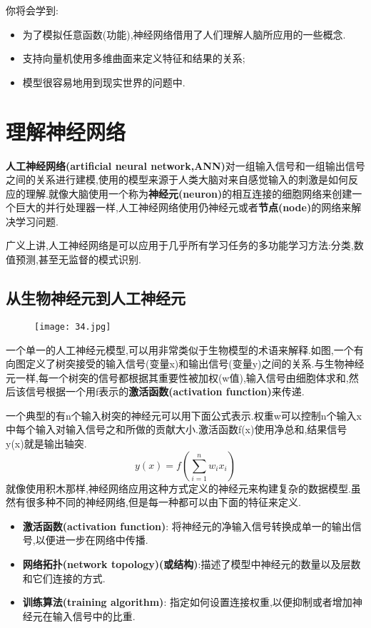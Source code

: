 \documentclass[11pt,a4paper,oneside]{book}
\begin{document}
你将会学到:
\begin{itemize}
	\item 为了模拟任意函数(功能),神经网络借用了人们理解人脑所应用的一些概念.
	\item 支持向量机使用多维曲面来定义特征和结果的关系;
	\item 模型很容易地用到现实世界的问题中.
\end{itemize}

\section{理解神经网络}
\textbf{人工神经网络(artificial neural network,ANN)}对一组输入信号和一组输出信号之间的关系进行建模,使用的模型来源于人类大脑对来自感觉输入的刺激是如何反应的理解.就像大脑使用一个称为\textbf{神经元(neuron)}的相互连接的细胞网络来创建一个巨大的并行处理器一样,人工神经网络使用仍神经元或者\textbf{节点(node)}的网络来解决学习问题.

广义上讲,人工神经网络是可以应用于几乎所有学习任务的多功能学习方法:分类,数值预测,甚至无监督的模式识别.

\subsection{从生物神经元到人工神经元}
\begin{figure}[H]
	\centering
	\texttt{[image: 34.jpg]}
\end{figure}
一个单一的人工神经元模型,可以用非常类似于生物模型的术语来解释.如图,一个有向图定义了树突接受的输入信号(变量x)和输出信号(变量y)之间的关系.与生物神经元一样,每一个树突的信号都根据其重要性被加权(w值),输入信号由细胞体求和,然后该信号根据一个用f表示的\textbf{激活函数(activation function)}来传递.

一个典型的有n个输入树突的神经元可以用下面公式表示.权重w可以控制n个输入x中每个输入对输入信号之和所做的贡献大小.激活函数f(x)使用净总和,结果信号y(x)就是输出轴突.
\begin{equation}
y(x)=f(\sum_{i=1}^{n}w_ix_i)
\end{equation}
就像使用积木那样,神经网络应用这种方式定义的神经元来构建复杂的数据模型.虽然有很多种不同的神经网络,但是每一种都可以由下面的特征来定义.
\begin{itemize}
	\item \textbf{激活函数(activation function)}: 将神经元的净输入信号转换成单一的输出信号,以便进一步在网络中传播.
	\item \textbf{网络拓扑(network topology)(或结构)}:描述了模型中神经元的数量以及层数和它们连接的方式. 
	\item \textbf{训练算法(training algorithm)}: 指定如何设置连接权重,以便抑制或者增加神经元在输入信号中的比重.
\end{itemize}
\end{document}
